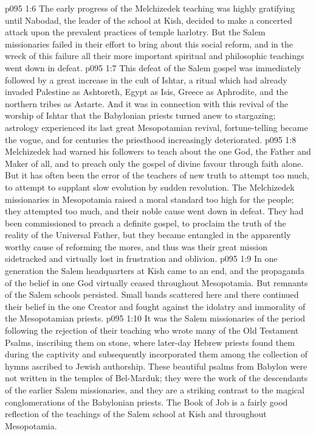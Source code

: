 \vs p095 1:6 \pc The early progress of the Melchizedek teaching was highly gratifying until Nabodad, the leader of the school at Kish, decided to make a concerted attack upon the prevalent practices of temple harlotry. But the Salem missionaries failed in their effort to bring about this social reform, and in the wreck of this failure all their more important spiritual and philosophic teachings went down in defeat.
\vs p095 1:7 This defeat of the Salem gospel was immediately followed by a great increase in the cult of Ishtar, a ritual which had already invaded Palestine as Ashtoreth, Egypt as Isis, Greece as Aphrodite, and the northern tribes as Astarte. And it was in connection with this revival of the worship of Ishtar that the Babylonian priests turned anew to stargazing; astrology experienced its last great Mesopotamian revival, fortune-telling became the vogue, and for centuries the priesthood increasingly deteriorated.
\vs p095 1:8 Melchizedek had warned his followers to teach about the one God, the Father and Maker of all, and to preach only the gospel of divine favour through faith alone. But it has often been the error of the teachers of new truth to attempt too much, to attempt to supplant slow evolution by sudden revolution. The Melchizedek missionaries in Mesopotamia raised a moral standard too high for the people; they attempted too much, and their noble cause went down in defeat. They had been commissioned to preach a definite gospel, to proclaim the truth of the reality of the Universal Father, but they became entangled in the apparently worthy cause of reforming the mores, and thus was their great mission sidetracked and virtually lost in frustration and oblivion.
\vs p095 1:9 In one generation the Salem headquarters at Kish came to an end, and the propaganda of the belief in one God virtually ceased throughout Mesopotamia. But remnants of the Salem schools persisted. Small bands scattered here and there continued their belief in the one Creator and fought against the idolatry and immorality of the Mesopotamian priests.
\vs p095 1:10 \pc It was the Salem missionaries of the period following the rejection of their teaching who wrote many of the Old Testament Psalms, inscribing them on stone, where later\hyp{}day Hebrew priests found them during the captivity and subsequently incorporated them among the collection of hymns ascribed to Jewish authorship. These beautiful psalms from Babylon were not written in the temples of Bel\hyp{}Marduk; they were the work of the descendants of the earlier Salem missionaries, and they are a striking contrast to the magical conglomerations of the Babylonian priests. The Book of Job is a fairly good reflection of the teachings of the Salem school at Kish and throughout Mesopotamia.
